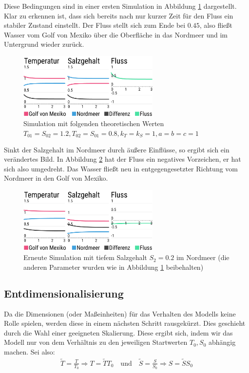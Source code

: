 \documentclass[a4paper,twoside]{article}
\begin{document}
	Diese Bedingungen sind in einer ersten Simulation in Abbildung \ref{fig:modell_q_pos}  dargestellt. Klar zu erkennen ist, dass sich bereits nach nur kurzer Zeit für den Fluss ein stabiler Zustand einstellt. Der Fluss stellt sich zum Ende bei \(0.45\), also fließt Wasser vom Golf von Mexiko über die Oberfläche in das Nordmeer und im Untergrund wieder zurück.
	
	\begin{figure}[!h]
  		\centering
 		\includegraphics[width=7cm]{../Diagramme/temp-salt-flow_q-pos.png}
  		\caption{Simulation mit folgenden theoretischen Werten \(T_{01} = S_{02} = 1.2, T_{02} = S_{01} = 0.8, k_T = k_S = 1, a = b = c = 1\)}
  		\label{fig:modell_q_pos}
	\end{figure}
	
	Sinkt der Salzgehalt im Nordmeer durch äußere Einflüsse, so ergibt sich ein verändertes Bild. In Abbildung \ref{fig:modell_q_neg} hat der Fluss ein negatives Vorzeichen, er hat sich also umgedreht. Das Wasser fließt neu in entgegengesetzter Richtung vom Nordmeer in den Golf von Mexiko.
	\begin{figure}[!h]
  		\centering
 		\includegraphics[width=7cm]{../Diagramme/temp-salt-flow_q-neg.png}
  		\caption{Erneute Simulation mit tiefem Salzgehalt \(S_2 = 0.2\) im Nordmeer (die anderen Parameter wurden wie in Abbildung \ref{fig:modell_q_pos} beibehalten)}
  		\label{fig:modell_q_neg}
	\end{figure}
	
	\subsection{Entdimensionalisierung}
	Da die Dimensionen (oder Maßeinheiten) für das Verhalten des Modells keine Rolle spielen, werden diese in einem nächsten Schritt rausgekürzt. Dies geschieht durch die Wahl einer geeigneten Skalierung. Diese ergibt sich, indem wir das Modell nur von dem Verhältnis zu den jeweiligen Startwerten \(T_0, S_0\) abhängig machen. Sei also:
	\begin{align*}
		\tilde{T} = \frac{T}{T_0} \Rightarrow T = \tilde{T} T_0 \quad \textrm{und} \quad \tilde{S} = \frac{S}{S_0} \Rightarrow S = \tilde{S} S_0
	\end{align*}
	
\end{document}
